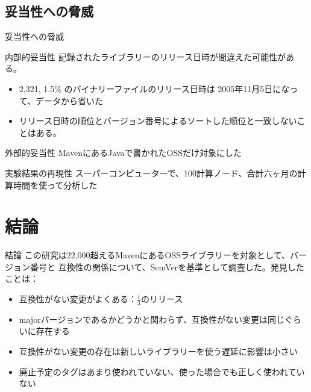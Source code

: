 \subsection{妥当性への脅威}
\begin{frame}[shrink=10]{妥当性への脅威}
\begin{block}{内部的妥当性}
記録されたライブラリーのリリース日時が間違えた可能性がある。
\begin{itemize}
\item 2,321, 1.5\% のバイナリーファイルのリリース日時は 2005年11月5日になって、データから省いた
\item リリース日時の順位とバージョン番号によるソートした順位と一致しないことはある。
\end{itemize}

\end{block}

\begin{block}{外部的妥当性}
MavenにあるJavaで書かれたOSSだけ対象にした
\end{block}

\begin{block}{実験結果の再現性}
スーパーコンピューターで、100計算ノード、合計六ヶ月の計算時間を使って分析した
\end{block}
\end{frame}
\section{結論}
\begin{frame}{結論}
この研究は22,000超えるMavenにあるOSSライブラリーを対象として、バージョン番号と
互換性の関係について、SemVerを基準として調査した。発見したことは：
\begin{itemize}
\item 互換性がない変更がよくある：$\frac{1}{3}$のリリース
\item majorバージョンであるかどうかと関わらず、互換性がない変更は同じぐらいに存在する
\item 互換性がない変更の存在は新しいライブラリーを使う遅延に影響は小さい
\item 廃止予定のタグはあまり使われていない、使った場合でも正しく使われていない
\end{itemize}
\end{frame}


\appendix
\backupbegin



\backupend

